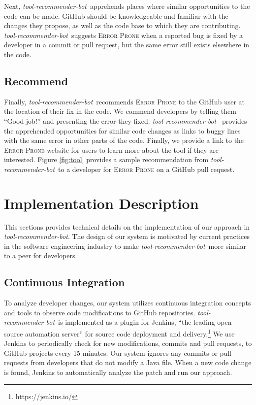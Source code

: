 \documentclass[sigconf,review,anonymous]{acmart}
\newcommand{\tool}{\textsl{tool-recommender-bot}}
\begin{document}
Next, \tool~apprehends places where similar opportunities to the code can be made. GitHub should be knowledgeable and familiar with the changes they propose, as well as the code base to which they are contributing. \tool~suggests \textsc{Error Prone} when a reported bug is fixed by a developer in a commit or pull request, but the same error still exists elsewhere in the code. 

\subsection{Recommend}

Finally, \tool~recommends \textsc{Error Prone} to the GitHub user at the location of their fix in the code. We commend developers by telling them ``Good job!'' and presenting the error they fixed. \tool~ provides the apprehended opportunities for similar code changes as links to buggy lines with the same error in other parts of the code. Finally, we provide a link to the \textsc{Error Prone} website for users to learn more about the tool if they are interested. Figure \ref{fig:tool} provides a sample recommendation from \tool~to a developer for \textsc{Error Prone} on a GitHub pull request.

\section{Implementation Description}

This sections provides technical details on the implementation of our approach in \tool. The design of our system is motivated by current practices in the software engineering industry to make \tool~more similar to a peer for developers.

\subsection{Continuous Integration}

To analyze developer changes, our system utilizes continuous integration concepts and tools to observe code modifications to GitHub repositories. \tool~is implemented as a plugin for Jenkins, ``the leading open source automation server'' for source code deployment and delivery.\footnote{https://jenkins.io/} We use Jenkins to periodically check for new modifications, commits and pull requests, to GitHub projects every 15 minutes. Our system ignores any commits or pull requests from developers that do not modify a Java file.
When a new code change is found, Jenkins to automatically analyze the patch and run our approach. 
\end{document}

